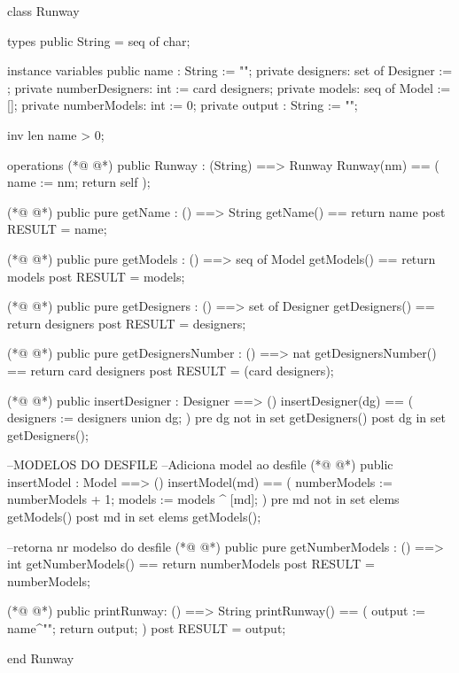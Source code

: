 \begin{vdmpp}[breaklines=true]
class Runway

types
 public String = seq of char;
 
instance variables
 public  name : String := "";
 private designers: set of Designer := {};
 private numberDesigners: int := card designers;
 private models: seq of Model := [];
 private numberModels: int := 0;
 private output : String := "";
 
 inv len name > 0;
 
 operations
(*@
\label{Runway:17}
@*)
 public Runway : 
         (String)
          ==> Runway
  Runway(nm) == (
  name := nm;
  return self
 );
 
(*@
\label{getName:25}
@*)
 public pure getName : () ==> String
    getName() == return name
 post RESULT = name;
  
(*@
\label{getModels:29}
@*)
 public pure getModels : () ==> seq of Model
     getModels() == return models
 post RESULT = models;
     
(*@
\label{getDesigners:33}
@*)
 public pure getDesigners : () ==> set of Designer
     getDesigners() == return designers
 post RESULT = designers;
 
(*@
\label{getDesignersNumber:37}
@*)
 public pure getDesignersNumber : () ==> nat
     getDesignersNumber() == return card designers 
 post RESULT = (card designers);
         
(*@
\label{insertDesigner:41}
@*)
 public insertDesigner : Designer ==> ()
  insertDesigner(dg) ==
  (
    designers := designers union  {dg};
  )
  pre dg not in set getDesigners()
  post dg in set getDesigners();
  
  --MODELOS DO DESFILE
  --Adiciona model ao desfile
(*@
\label{insertModel:51}
@*)
 public insertModel : Model ==> ()
  insertModel(md) ==
  (
    numberModels := numberModels + 1;
    models := models ^  [md];
  )
  pre md not in set elems getModels()
  post md  in set elems getModels();
  
  --retorna nr modelso do desfile
(*@
\label{getNumberModels:61}
@*)
  public pure getNumberModels : () ==> int
  getNumberModels() == return numberModels
  post RESULT = numberModels;
  
(*@
\label{printRunway:65}
@*)
  public printRunway: () ==> String
  printRunway() == (
  output := name^"\n";
  return output;
  )
 post RESULT = output;
    
end Runway
\end{vdmpp}
\bigskip
